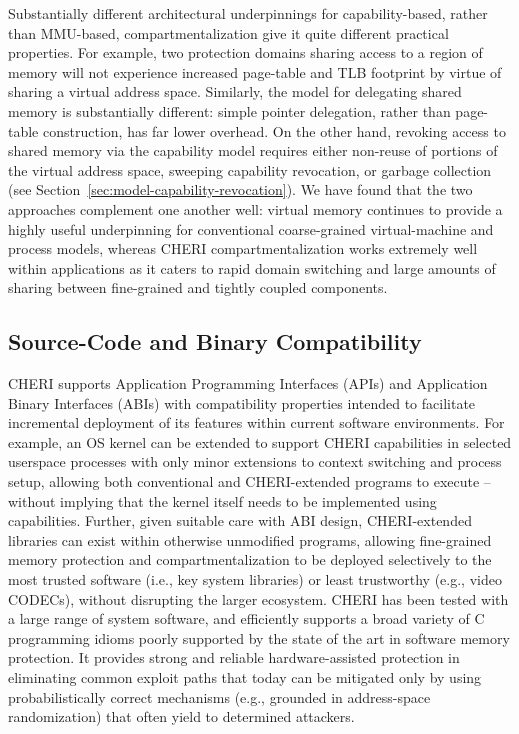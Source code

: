 Substantially different architectural underpinnings for capability-based,
rather than MMU-based, compartmentalization give it quite different practical
properties.
For example, two protection domains sharing access to a region of memory will
not experience increased page-table and TLB footprint by virtue of sharing a
virtual address space.
Similarly, the model for delegating shared memory is substantially different:
simple pointer delegation, rather than page-table construction, has far lower
overhead.
On the other hand, revoking access to shared memory via the capability model
requires either non-reuse of portions of the virtual address space, sweeping
capability revocation, or garbage collection (see
Section~\ref{sec:model-capability-revocation}).
We have found that the two approaches complement one another well: virtual
memory continues to provide a highly useful underpinning for conventional
coarse-grained virtual-machine and process models, whereas CHERI
compartmentalization works extremely well within applications as it caters to
rapid domain switching and large amounts of sharing between fine-grained and
tightly coupled components.

\subsection{Source-Code and Binary Compatibility}

CHERI supports Application Programming Interfaces (APIs) and
Application Binary Interfaces (ABIs) with compatibility properties intended
to facilitate incremental deployment of its features within current software
environments.
For example, an OS kernel can be extended to support CHERI capabilities in
selected userspace processes with only minor extensions to context switching
and process setup, allowing both conventional and CHERI-extended programs to
execute -- without implying that the kernel itself needs to be implemented
using capabilities.
Further, given suitable care with ABI design, CHERI-extended libraries can
exist within otherwise unmodified programs, allowing fine-grained memory
protection and compartmentalization to be deployed selectively to the most
trusted software (i.e., key system libraries) or least trustworthy (e.g.,
video CODECs), without disrupting the larger ecosystem.
CHERI has been tested with a large range of system software, and efficiently
supports a broad variety of C programming idioms poorly supported by the state
of the art in software memory protection.
It provides strong and reliable hardware-assisted protection in eliminating
common exploit paths that today can be mitigated only by using probabilistically
correct mechanisms (e.g., grounded in address-space randomization) that often
yield to determined attackers.

